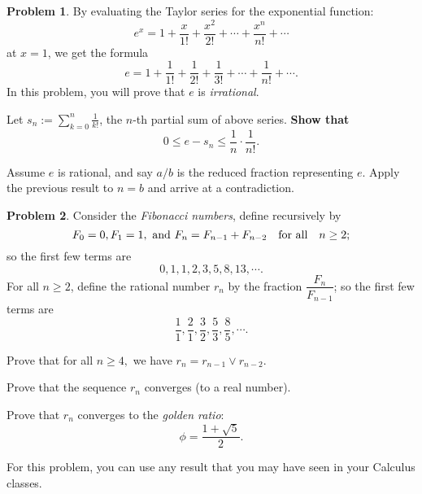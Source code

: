 \documentclass[11pt]{article}
\theoremstyle{plain}
\theoremstyle{definition}
\newtheorem{problem}{Problem}
\theoremstyle{remark}
\numberwithin{equation}{problem}
\begin{document}
\begin{problem}
	By evaluating the Taylor series for the exponential function:
	\[
		e^{x} = 1 + \frac{x}{1!} + \frac{x^2}{2!} + \cdots + \frac{x^n}{n!} + \cdots
	\]
	at $x=1$, we get the formula
	\[
		e = 1 + \frac{1}{1!} + \frac{1}{2!} + \frac{1}{3!} + \cdots + \frac{1}{n!} + \cdots.
	\]
	In this problem, you will prove that $e$ is \emph{irrational}.
	\begin{listinprob}
		\item Let $s_n := \sum\limits_{k=0}^n \frac{1}{k!}$, the $n$-th partial sum of above series. \textbf{Show that} 
		\[
			0 \leq e - s_n \leq \frac{1}{n}\cdot \frac{1}{n!}.
		\]
	\end{listinprob}
	\begin{listinprob}[resume]
		\item Assume $e$ is rational, and say $a/b$ is the reduced fraction representing $e$. Apply the previous result to $n = b$ and arrive at a contradiction.
	\end{listinprob}
\end{problem}

\begin{problem}
	Consider the \emph{Fibonacci numbers}, define recursively by
	\[
		F_0 = 0, F_1 = 1, \text{ and } F_n = F_{n-1} + F_{n-2} \quad\text{for all}\quad 
		n\geq 2;
	\]
	so the first few terms are 
	\[
		0,1,1,2,3,5,8,13,\cdots.
	\]
	For all $n\geq 2$, define the rational number $r_n$ by the fraction $\dfrac{F_n}{F_{n-1}}$; so the first few terms are
	\[
		\frac{1}{1}, \frac{2}{1}, \frac{3}{2}, \frac{5}{3}, \frac{8}{5}, \cdots.
	\]
	\begin{listinprob}
		\item Prove that for all $n\geq 4,$ we have $r_n = r_{n-1} \vee r_{n-2}$.
	\end{listinprob}
	\begin{listinprob}[resume]
		\item Prove that the sequence $r_n$ converges (to a real number).
	\end{listinprob}
	\begin{listinprob}[resume]
		\item Prove that $r_n$ converges to the \emph{golden ratio}:
		\[
			\phi = \frac{1 + \sqrt{5}}{2}.
		\]
	\end{listinprob}
	For this problem, you can use any result that you may have seen in your Calculus classes.
\end{problem}
\end{document}
